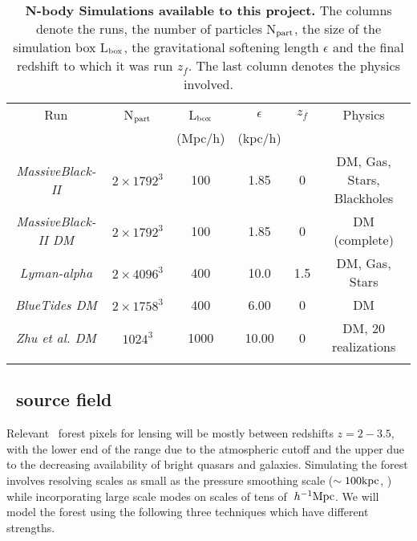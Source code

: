 \begin{table}[h]
\begin{center}
\footnotesize
\begin{tabular}{cccccc}

\hline\hline
  Run & N$_{\rm part}$   &   L$_{\rm box}$ &$\epsilon$&  $z_f$ & Physics \\
& & (Mpc/h) & (kpc/h)& & \\
  \hline
  {\it MassiveBlack-II} & $2\times 1792^3$ & 100 & 1.85 & 0 & DM, Gas, Stars, 
Blackholes\\
 {\it MassiveBlack-II  DM} & $2\times 1792^3$ & 100 & 1.85 & 0 & DM (complete)\\
\hline
  {\it Lyman-alpha} & $2\times 4096^3$ & 400 & 10.0&  1.5 & DM, Gas, 
Stars \\
{\it BlueTides DM} & $2\times 1758^3$ & 400 & 6.00 & 0 & DM  \\
{\it Zhu et al. DM} & $1024^3$ & 1000 & 10.00 & 0 & DM, 20 realizations  \\
\hline\\
\end{tabular}
\normalsize
\end{center}
\vspace{-1cm}
\caption{\footnotesize {\bf N-body Simulations available to this project.} 
  The columns denote the runs, the number of particles
  N$_{\rm part}$, the size of the simulation box  L$_{\rm box}$, the
  gravitational softening length $\epsilon$ and the final redshift 
to which it was run $z_f$. The
  last column denotes the physics involved. }
\label{tab_runs}
\end{table}
\vspace{-0.5cm}


\subsection{\lya\ source field}

Relevant \lya\ forest pixels for lensing will be mostly between 
 redshifts $z=2-3.5$, with the lower end of the range due to the atmospheric 
cutoff and the upper due to the decreasing availability of bright 
quasars and galaxies. Simulating the forest  involves resolving scales as
small as the pressure smoothing scale ($\sim 100 {\rm kpc}$, \cite{peeples10}) while
incorporating large scale modes on scales of tens of $\;h^{-1}{\rm Mpc}$.
We will model the forest using the following
three techniques which have different
strengths.

